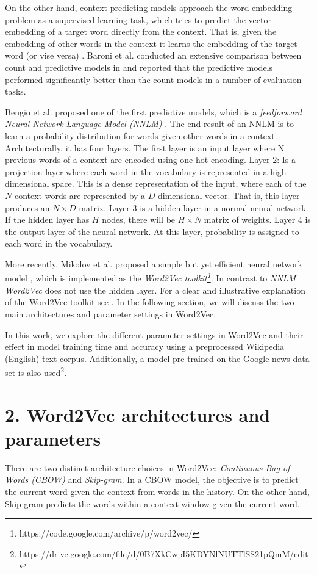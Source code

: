 \documentclass[12pt]{report}
\begin{document}
On the other hand, context-predicting models approach the word embedding problem as a supervised learning task, which tries to predict the vector embedding of a target word directly from the context. That is, given the embedding of other words in the context it 
learns the embedding of the target word (or vise versa) \cite{Bengio:2003:NPL:944919.944966,mikolov2013efficient}. Baroni et al. conducted an extensive comparison between count and predictive models in \cite{marcobaroni2014predict} 
and reported that the predictive models performed significantly better than the count models in a number of evaluation tasks.

Bengio et al. proposed one of the first predictive models, which is a \emph{feedforward Neural Network Language Model (NNLM)} \cite{Bengio:2003:NPL:944919.944966}. The end result 
of an NNLM is to learn a probability distribution for words given other words in a context.
Architecturally, it has four layers. The first layer is an input layer where N previous words of a context are encoded using one-hot encoding. Layer 2: Is a projection layer where each word in the vocabulary is represented in a high dimensional space. This is a dense representation of the input, where each of the $N$ context words are represented by a $D$-dimensional vector. That is, this layer produces an $N\times D$ matrix.
Layer 3 is a hidden layer in a normal neural network. If the hidden layer has $H$ nodes, there will be $H\times N$ matrix of weights. Layer 4 is the output layer of the neural network. At this layer, probability is assigned to each word in the vocabulary.

More recently, Mikolov et al. proposed a simple but yet efficient neural network model \cite{mikolov2013efficient}, which is implemented as the \emph{Word2Vec toolkit\footnote{https://code.google.com/archive/p/word2vec/}}. In contrast to \emph{NNLM  Word2Vec} does not use the hidden layer. For a clear and illustrative 
explanation of the Word2Vec toolkit see \cite{rong2014word2vec}. In the following section, we will discuss the two main architectures and parameter settings in Word2Vec.

In this work, we explore the different parameter settings in Word2Vec and their effect in 
model training time and accuracy using a preprocessed Wikipedia (English) text corpus. Additionally, a model pre-trained on the Google news data set is also used\footnote{https://drive.google.com/file/d/0B7XkCwpI5KDYNlNUTTlSS21pQmM/edit}.

\section*{2. Word2Vec architectures and parameters}
There are two distinct architecture choices in Word2Vec: \emph{Continuous Bag of Words (CBOW)} and \emph{Skip-gram}. In a CBOW model, the objective is to predict the current word
given the context from words in the history. On the other hand, Skip-gram predicts the words within a context window given the current word. 
\end{document}
